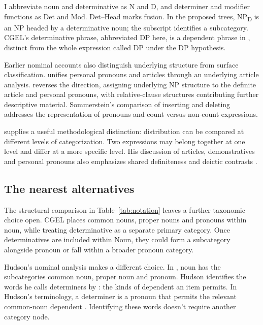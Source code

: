 \documentclass[12pt]{article}
\begin{document}
I abbreviate noun and determinative as N and D, and determiner and modifier functions as Det and Mod. Det--Head marks fusion. In the proposed trees, NP\textsubscript{D} is an NP headed by a determinative noun; the subscript identifies a subcategory. CGEL's determinative phrase, abbreviated DP here, is a dependent phrase in , distinct from the whole expression called DP under the DP hypothesis.

Earlier nominal accounts also distinguish underlying structure from surface classification. \textcite{postal1966} unifies personal pronouns and articles through an underlying article analysis. \textcite[197--203]{sommerstein1972} reverses the direction, assigning underlying NP structure to the definite article and personal pronouns, with relative-clause structures contributing further descriptive material. Sommerstein's comparison of inserting and deleting  addresses the representation of pronouns and count versus non-count expressions.

\textcite[232--235]{lyons1968} supplies a useful methodological distinction: distribution can be compared at different levels of categorization. Two expressions may belong together at one level and differ at a more specific level. His discussion of articles, demonstratives and personal pronouns also emphasizes shared definiteness and deictic contrasts \citep[279]{lyons1968}.

\subsection{The nearest alternatives}

The structural comparison in Table~\ref{tab:notation} leaves a further taxonomic choice open. CGEL places common nouns, proper nouns and pronouns within noun, while treating determinative as a separate primary category. Once determinatives are included within Noun, they could form a subcategory alongside pronoun or fall within a broader pronoun category.

Hudson's nominal analysis makes a different choice. In \textcite[253--254]{hudson2010wordgrammar}, noun has the subcategories common noun, proper noun and pronoun. Hudson identifies the words he calls determiners by : the kinds of dependent an item permits. In Hudson's terminology, a determiner is a pronoun that permits the relevant common-noun dependent \citep[9--10]{hudson2004determiners}. Identifying these words doesn't require another category node.
\end{document}

